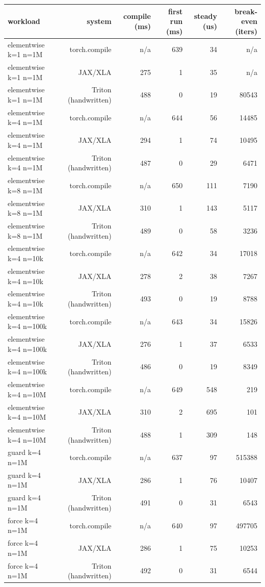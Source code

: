 \begin{tabular}{lrrrrr}
\toprule
workload & system & compile (ms) & first run (ms) & steady (us) & break-even (iters) \\
\midrule
elementwise k=1 n=1M & torch.compile & n/a & 639 & 34 & n/a \\
elementwise k=1 n=1M & JAX/XLA & 275 & 1 & 35 & n/a \\
elementwise k=1 n=1M & Triton (handwritten) & 488 & 0 & 19 & 80543 \\
elementwise k=4 n=1M & torch.compile & n/a & 644 & 56 & 14485 \\
elementwise k=4 n=1M & JAX/XLA & 294 & 1 & 74 & 10495 \\
elementwise k=4 n=1M & Triton (handwritten) & 487 & 0 & 29 & 6471 \\
elementwise k=8 n=1M & torch.compile & n/a & 650 & 111 & 7190 \\
elementwise k=8 n=1M & JAX/XLA & 310 & 1 & 143 & 5117 \\
elementwise k=8 n=1M & Triton (handwritten) & 489 & 0 & 58 & 3236 \\
elementwise k=4 n=10k & torch.compile & n/a & 642 & 34 & 17018 \\
elementwise k=4 n=10k & JAX/XLA & 278 & 2 & 38 & 7267 \\
elementwise k=4 n=10k & Triton (handwritten) & 493 & 0 & 19 & 8788 \\
elementwise k=4 n=100k & torch.compile & n/a & 643 & 34 & 15826 \\
elementwise k=4 n=100k & JAX/XLA & 276 & 1 & 37 & 6533 \\
elementwise k=4 n=100k & Triton (handwritten) & 486 & 0 & 19 & 8349 \\
elementwise k=4 n=10M & torch.compile & n/a & 649 & 548 & 219 \\
elementwise k=4 n=10M & JAX/XLA & 310 & 2 & 695 & 101 \\
elementwise k=4 n=10M & Triton (handwritten) & 488 & 1 & 309 & 148 \\
guard k=4 n=1M & torch.compile & n/a & 637 & 97 & 515388 \\
guard k=4 n=1M & JAX/XLA & 286 & 1 & 76 & 10407 \\
guard k=4 n=1M & Triton (handwritten) & 491 & 0 & 31 & 6543 \\
force k=4 n=1M & torch.compile & n/a & 640 & 97 & 497705 \\
force k=4 n=1M & JAX/XLA & 286 & 1 & 75 & 10253 \\
force k=4 n=1M & Triton (handwritten) & 492 & 0 & 31 & 6544 \\

\end{tabular}
